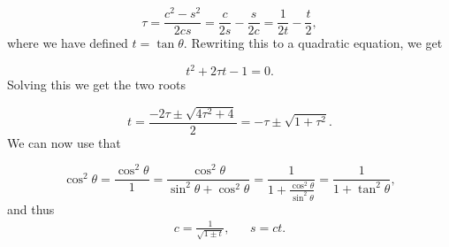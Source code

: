 \documentclass{emulateapj}
\begin{document}
        \begin{equation*}
            \tau = \dfrac{c^2 - s^2}{2cs} = \dfrac{c}{2s} - \dfrac{s}{2c} = \dfrac{1}{2t} - \dfrac{t}{2},
        \end{equation*}
        where we have defined \(t = \tan{\theta}\). Rewriting this to a quadratic equation, we get
        
        \begin{equation}
            t^2 + 2\tau t - 1 = 0. \nonumber
        \end{equation}
        Solving this we get the two roots
        
        \begin{equation}\label{eq:t_roots}
            t = \dfrac{-2\tau \pm \sqrt{4\tau^2 + 4}}{2} = -\tau \pm \sqrt{1 + \tau^2}.
        \end{equation}
        We can now use that 

        \begin{equation*}
            \cos^{2}\theta = \frac{\cos^{2}\theta}{1} = \frac{\cos^{2}\theta}{\sin^{2}\theta + \cos^{2}\theta} = \frac{1}{1 + \frac{\cos^{2}\theta}{\sin^{2}\theta}} = \frac{1}{1 + \tan^{2}\theta},
        \end{equation*}
        and thus
        \begin{align}\label{eq: cos_sin}
            c = \frac{1}{\sqrt{1 \pm t}}, && s = ct.
        \end{align}

\end{document}
